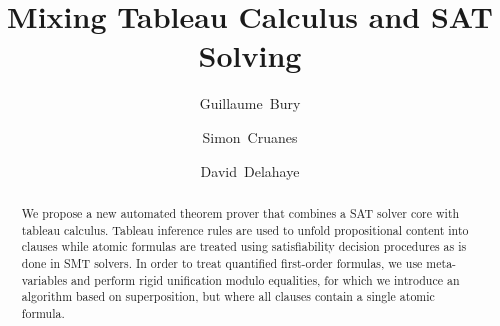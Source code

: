 \documentclass{llncs}
\begin{document}
\title{Mixing Tableau Calculus and SAT Solving}

\author{Guillaume~Bury \and Simon~Cruanes \and
David~Delahaye}


\maketitle

\begin{abstract}
We propose a new automated theorem prover that combines a SAT solver core with
tableau calculus. Tableau inference rules are used to unfold propositional
content into clauses while atomic formulas are treated using satisfiability
decision procedures as is done in SMT solvers. In order to treat quantified
first-order formulas, we use meta-variables and perform rigid unification modulo
equalities, for which we introduce an algorithm based on superposition, but
where all clauses contain a single atomic formula.

\end{abstract}






\end{document}
